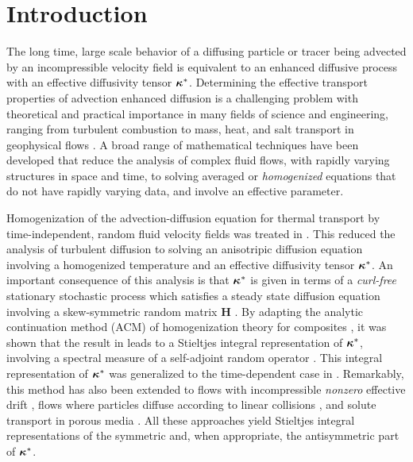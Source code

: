 \documentclass[11pt]{amsart}
\newcommand{\Hb}{\mathbf{H}}
\newcommand\bkappa{\mbox{\boldmath${\kappa}$}}
\begin{document}
\section{Introduction}\label{sec:Introduction}
%
The long time, large scale behavior of a diffusing particle   
or tracer being advected by an incompressible velocity field 
is equivalent to an enhanced diffusive process \cite{Taylor:PRSL:196} 
with an effective diffusivity tensor $\bkappa^*$.
Determining the effective transport properties of advection enhanced
diffusion is a challenging problem with theoretical and practical 
importance in many fields of science and engineering,
ranging from turbulent combustion to mass, heat, and salt transport in
geophysical flows \cite{Moffatt:RPP:621}. A broad range of
mathematical techniques have been developed that reduce the analysis
of complex fluid flows, with rapidly varying structures in space and
time, to solving averaged or \textit{homogenized} equations that do
not have rapidly varying data, and involve an effective parameter.




Homogenization of the advection-diffusion equation for thermal
transport by time-independent, random fluid velocity fields was
treated in \cite{McLaughlin:SIAM_JAM:780}. This 
reduced the analysis of turbulent diffusion to solving an anisotripic
diffusion equation involving a homogenized temperature and an
effective diffusivity tensor $\bkappa^*$. An important consequence of
this analysis is that $\bkappa^*$ is given in terms  
of a \emph{curl-free} stationary stochastic process which satisfies a
steady state diffusion equation involving a skew-symmetric random
matrix $\Hb$ \cite{Avellaneda:CMP-339,Avellaneda:PRL-753}. By adapting
the analytic continuation method (ACM) of homogenization theory for
composites \cite{Golden:CMP-473}, it was shown that the result in
\cite{McLaughlin:SIAM_JAM:780} leads to a Stieltjes integral
representation of $\bkappa^*$, involving a spectral measure of a
self-adjoint random operator
\cite{Avellaneda:CMP-339,Avellaneda:PRL-753}. This integral
representation of $\bkappa^*$ was generalized to the time-dependent
case in \cite{Avellaneda:PRE:3249,Biferale:PF:2725}. Remarkably, this 
method has also been extended to flows with incompressible
\emph{nonzero} effective drift 
\cite{Pavliotis:PHD_Thesis}, flows where particles diffuse according
to linear collisions \cite{Pavliotis:IMAJAM:951}, and solute transport
in porous media \cite{Bhattacharya:AAP:1999:951}. All these approaches
yield Stieltjes integral representations of the symmetric and, when
appropriate, the antisymmetric part of $\bkappa^*$.
\end{document}
